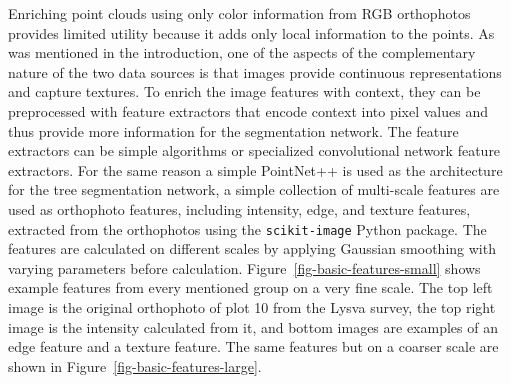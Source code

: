 Enriching point clouds using only color information from RGB orthophotos provides limited utility because it adds only local information to the points.
As was mentioned in the introduction, one of the aspects of the complementary nature of the two data sources is that images provide continuous representations and capture textures.
To enrich the image features with context, they can be preprocessed with feature extractors that encode context into pixel values and thus provide more information for the segmentation network.
The feature extractors can be simple algorithms or specialized convolutional network feature extractors.
For the same reason a simple PointNet++ is used as the architecture for the tree segmentation network, a simple collection of multi-scale features are used as orthophoto features, including intensity, edge, and texture features, extracted from the orthophotos using the \texttt{scikit-image} Python package.
The features are calculated on different scales by applying Gaussian smoothing with varying parameters before calculation.
Figure~\ref{fig-basic-features-small} shows example features from every mentioned group on a very fine scale.
The top left image is the original orthophoto of plot 10 from the Lysva survey, the top right image is the intensity calculated from it, and bottom images are examples of an edge feature and a texture feature.
The same features but on a coarser scale are shown in Figure~\ref{fig-basic-features-large}.

